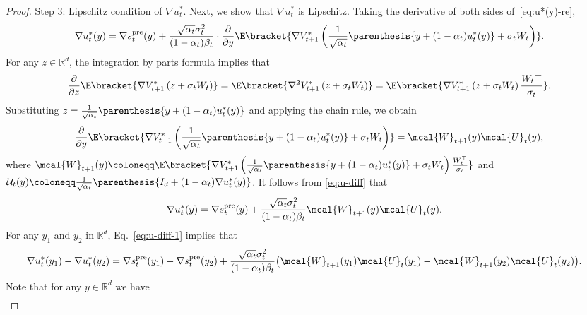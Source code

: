 \documentclass{article}
\newcommand{\R}{\mathbb{R}}
\begin{document}
\begin{proof}
\underline{Step 3: Lipschitz condition of $  \nabla u_{t}^{*}$.} Next, we show that $\nabla u_t^*$ is Lipschitz. Taking the derivative of both sides of~\eqref{eq:u*(y)-re},
\begin{align}
    \nabla u_{t}^{*}(y) = \nabla s_{t}^{\rm pre}(y) + \frac{\sqrt{\alpha_{t}}\sigma_{t}^{2}}{(1 - \alpha_{t})\beta_t}\cdot\frac{\partial}{\partial y} \E\bracket{\nabla {V}^*_{t+1}\left(\frac{1}{\sqrt{\alpha_t}}\parenthesis{y + (1 - \alpha_t)u_t^{*}(y)} + \sigma_t W_t\right)}. \label{eq:u-diff}
\end{align}
For any $ z \in \R^{d} $, the integration by parts formula implies that
\begin{align}\label{eq:magic-1}
    \frac{\partial}{\partial z}\E\bracket{\nabla {V}^*_{t+1}\left(z + \sigma_t W_t\right)} = \E\bracket{\nabla^{2} {V}^*_{t+1}\left(z + \sigma_t W_t\right)} = \E\bracket{\nabla {V}^*_{t+1}\left(z + \sigma_t W_t\right)\frac{W_t\top}{\sigma_t}}.
\end{align}
Substituting $ z = \frac{1}{\sqrt{\alpha_t}}\parenthesis{y + (1 - \alpha_t)u_t^{*}(y)} $ and applying the chain rule, we obtain
\begin{align*}
     \frac{\partial}{\partial y}\E\bracket{\nabla {V}^*_{t+1}\left(\frac{1}{\sqrt{\alpha_t}}\parenthesis{y + (1 - \alpha_t)u_t^{*}(y)} + \sigma_t W_t\right)}  = \mcal{W}_{t+1}(y)\mcal{U}_t(y),
\end{align*}
where $\mcal{W}_{t+1}(y)  \coloneqq  \E\bracket{\nabla {V}^*_{t+1}\left(\frac{1}{\sqrt{\alpha_t}}\parenthesis{y + (1 - \alpha_t)u_t^{*}(y)} + \sigma_t W_t\right)\frac{W_t^\top}{\sigma_t}}$ and $\mathcal{U}_t(y) \coloneqq \frac{1}{\sqrt{\alpha_t}}\parenthesis{I_d + (1 - \alpha_t) \nabla u_t^*(y)}$. It follows from \eqref{eq:u-diff} that
\begin{align}
    \nabla u_{t}^{*}(y)  & = \nabla s_{t}^{\rm pre}(y)  + \frac{\sqrt{\alpha_{t}}\sigma_{t}^{2}}{(1 - \alpha_{t})\beta_t} \mcal{W}_{t+1}(y)\mcal{U}_t(y). \label{eq:u-diff-1}
\end{align}
For any $y_1$ and $y_2$ in $\R^d$, Eq.~\eqref{eq:u-diff-1} implies that %
\begin{align}
\nabla u_t^{*} (y_1) - \nabla u_t^{*} (y_2)  & = \nabla s_{t}^{\rm pre}(y_{1}) - \nabla s_{t}^{\rm pre}(y_{2})  +  \frac{\sqrt{\alpha_{t}}\sigma_{t}^{2}}{(1 - \alpha_{t})\beta_t} \big(\mcal{W}_{t+1}(y_1)\mcal{U}_t(y_1)  - \mcal{W}_{t+1}(y_2)\mcal{U}_t(y_2)\big). \label{eq:u-lip-1}
\end{align}
Note that for any $ y \in \R^d$ we have
\begin{align}

\end{align}
\end{proof}
\end{document}
